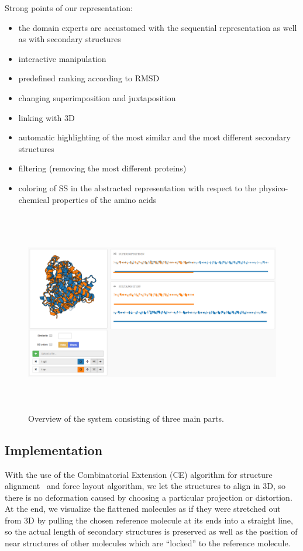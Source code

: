 \documentclass[twocolumn]{bmcart}%
\begin{document}
Strong points of our representation:
\begin{itemize}
\item the domain experts are accustomed with the sequential representation as well as with secondary structures
\item interactive manipulation
\item predefined ranking according to RMSD
\item changing superimposition and juxtaposition
\item linking with 3D
\item automatic highlighting of the most similar and the most different secondary structures
\item filtering (removing the most different proteins)
\item coloring of SS in the abstracted representation with respect to the physico-chemical properties of the amino acids
\end{itemize}
\begin{figure}[t!]
  \centering
  \includegraphics[height=3.5in]{pics/design.png}
  \caption{Overview of the system consisting of three main parts.}
  \label{fig:design}
\end{figure}

\subsection*{Implementation}
With the use of the Combinatorial Extension (CE) algorithm for structure alignment~\cite{Shindyalov1998} and force layout algorithm, we let the structures to align in 3D, so there is no deformation caused by choosing a particular projection or distortion. 
At the end, we visualize the flattened molecules as if they were stretched out from 3D by pulling the chosen reference molecule at its ends into a straight line, so the actual length of secondary structures is preserved as well as the position of near structures of other molecules which are “locked” to the reference molecule.
\end{document}
